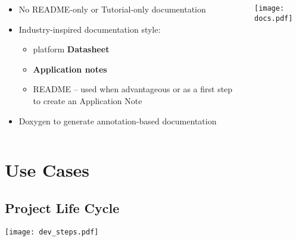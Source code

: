 \begin{frame}%
      
\begin{columns}
      \begin{column}{0.6\paperwidth}
         \centering
         \begin{itemize}
           \item No README-only or Tutorial-only documentation
           \item Industry-inspired documentation style:
             \begin{itemize}
               \item platform {\bf Datasheet}
               \item {\bf Application notes}
               \item README -- used when advantageous or as a first step to create an Application Note
             \end{itemize}
           \item Doxygen to generate annotation-based documentation
         \end{itemize}
      \end{column}
      \begin{column}{0.4\paperwidth}
         \centering
           \texttt{[image: docs.pdf]}\\
       \end{column}
    \end{columns}
  
\end{frame}


\section{Use Cases}
\subsection{Project Life Cycle}

\begin{frame}%
  \centering
  
  \texttt{[image: dev\_steps.pdf]}
  
\end{frame}



